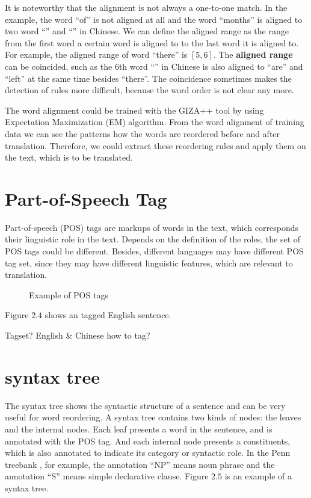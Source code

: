 \label{alignedrange}
It is noteworthy that the alignment is not always a one-to-one match. In the example, the word ``of'' is not aligned at all and the word ``months'' is aligned to two word ``'' and ``'' in Chinese. We can define the aligned range as the range from the first word a certain word is aligned to to the last word it is aligned to. For example, the aligned range of word ``there'' is $[5,6]$. The \textbf{aligned range} can be coincided, such as the $6$th word ``'' in Chinese is also aligned to ``are'' and ``left'' at the same time besides ``there''. The coincidence sometimes makes the detection of rules more difficult, because the word order is not clear any more.

The word alignment could be trained with the GIZA++ tool by using Expectation Maximization (EM) algorithm. From the word alignment of training data we can see the patterns how the words are reordered before and after translation. Therefore, we could extract these reordering rules and apply them on the text, which is to be translated.

\section{Part-of-Speech Tag}

Part-of-speech (POS) tags are markups of words in the text, which corresponds their linguistic role in the text. Depends on the definition of the roles, the set of POS tags could be different. Besides, different languages may have different POS tag set, since they may have different linguistic features, which are relevant to translation.
\begin{figure}[H]
\centering

\caption{Example of POS tags}
\end{figure}
Figure $2.4$ shows an tagged English sentence. 

Tagset? English \& Chinese how to tag?


\label{ch:Foundations:sec:PosTag}

\section{syntax tree}
\label{ch:Foundations:sec:SyntacticTree}

The syntax tree shows the syntactic structure of a sentence and can be very useful for word reordering. A syntax tree contains two kinds of nodes: the leaves and the internal nodes. Each leaf presents a word in the sentence, and is annotated with the POS tag. And each internal node presents a constituents, which is also annotated to indicate its category or syntactic role. In the Penn treebank \citep{penn}, for example, the annotation ``NP'' means noun phrase and the annotation ``S'' means simple declarative clause. Figure $2.5$ is an example of a syntax tree.

